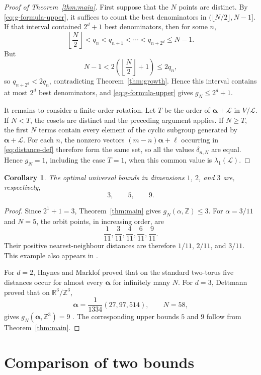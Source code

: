 \documentclass[11pt,reqno]{amsart}
\newtheorem{corollary}[theorem]{Corollary}
\theoremstyle{definition}
\newcommand{\R}{\mathbb R}
\newcommand{\Z}{\mathbb Z}
\newcommand{\0}{\mbf 0}%
\def\Z{\mathbb Z}
\def\R{\mathbb R}
\newcommand{\cL}{\mathcal L}
\newcommand{\balpha}{\boldsymbol{\alpha}}
\begin{document}
\begin{proof}[Proof of Theorem~\ref{thm:main}]
First suppose that the $N$ points are distinct. By
\eqref{eq:g-formula-upper}, it suffices to count the best denominators in
$\bigl(\lfloor N/2\rfloor,N-1\bigr]$. If that interval contained $2^d+1$
best denominators, then for some $n$,
$$
 \left\lfloor\frac N2\right\rfloor<q_n<q_{n+1}<\cdots<q_{n+2^d}\le N-1.
$$
But
$$
 N-1<2\left(\left\lfloor\frac N2\right\rfloor+1\right)\le2q_n,
$$
so $q_{n+2^d}<2q_n$, contradicting Theorem~\ref{thm:growth}. Hence this
interval contains at most $2^d$ best denominators, and
\eqref{eq:g-formula-upper} gives $g_N\le 2^d+1$.

It remains to consider a finite-order rotation. Let $T$ be the order of
$\balpha+\cL$ in $V/\cL$. If $N<T$, the cosets are distinct and the preceding
argument applies. If $N\ge T$, the first $N$ terms contain every element of
the cyclic subgroup generated by $\balpha+\cL$. For each $n$, the nonzero
vectors $(m-n)\balpha+\ell$ occurring in \eqref{eq:distance-def} therefore
form the same set, so all the values $\delta_{n,N}$ are equal. Hence $g_N=1$,
including the case $T=1$, when this common value is $\lambda_1(\cL)$.
\end{proof}

\begin{corollary}
The optimal universal bounds in dimensions $1$, $2$, and $3$ are, respectively,
$$
 3,\qquad 5,\qquad 9.
$$
\end{corollary}

\begin{proof}
Since $2^1+1=3$, Theorem~\ref{thm:main} gives
$g_N(\alpha,\Z)\le3$. For $\alpha=3/11$ and $N=5$, the orbit points, in
increasing order, are
$$
 \frac1{11},\frac3{11},\frac4{11},\frac6{11},\frac9{11}.
$$
Their positive nearest-neighbour distances are therefore $1/11$, $2/11$, and $3/11$.
This example also appears in \cite[Section~3.1]{Dettmann2025}.

For $d=2$, Haynes and Marklof \cite{HaynesMarklof2022} proved that on the standard two-torus five distances occur for almost every $\balpha$ for infinitely many $N$. For $d=3$, Dettmann proved that on $\R^3/\Z^3$,
$$
 \balpha=\frac1{1334}(27,97,514),\qquad N=58,
$$
gives $g_N(\balpha,\Z^3)=9$ \cite[Section~3.3]{Dettmann2025}.
The corresponding upper bounds $5$ and $9$ follow from
Theorem~\ref{thm:main}.
\end{proof}

\section{Comparison of two bounds}
\end{document}
